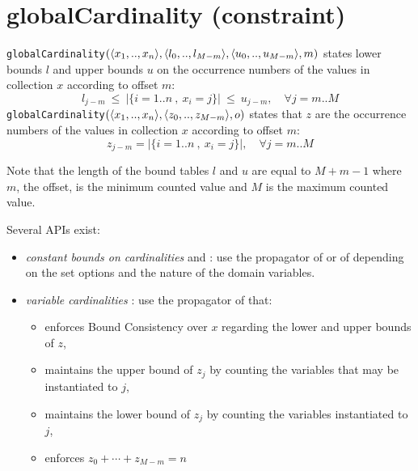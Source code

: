 \label{globalcardinality}
\hypertarget{globalcardinality}{}

\section{globalCardinality (constraint)}\label{globalcardinality:globalcardinalityconstraint}\hypertarget{globalcardinality:globalcardinalityconstraint}{}
\begin{notedef}
  \texttt{globalCardinality}$(\langle x_1,..,x_n\rangle,\langle l_0,..,l_{M-m}\rangle, \langle u_0,..,u_{M-m}\rangle, m)$ states lower bounds $l$ and upper bounds $u$ on the occurrence numbers of the values in collection $x$ according to offset $m$: 
$$l_{j-m}\ \le\ |\{i=1..n\ ,\ x_i=j\}|\ \le\ u_{j-m},\quad\forall j=m..M$$   
  \texttt{globalCardinality}$(\langle x_1,..,x_n\rangle,\langle z_0,..,z_{M-m}\rangle, o)$ states that $z$ are the occurrence numbers of the values in collection $x$ according to offset $m$: 
$$z_{j-m} = |\{i=1..n\ ,\ x_i=j\}|,\quad\forall j=m..M$$   
\end{notedef}
Note that the length of the bound tables $l$ and $u$ are equal to $M+m-1$ where $m$, the offset, is the minimum counted value and $M$ is the maximum counted value.

Several APIs exist:
\begin{itemize}
	\item \emph{constant bounds on cardinalities}  and : use the propagator of \cite{ReginAAAI96} or of \cite{QuimperCP03} depending on the set options and the nature of the domain variables.
	\item \emph{variable cardinalities} : use the propagator of \cite{QuimperCP03} that:      
      \begin{itemize}
      \item enforces Bound Consistency over $x$ regarding the lower and upper bounds of $z$, 
      \item maintains the upper bound of $z_j$ by counting the variables that may be instantiated to $j$, 
      \item maintains the lower bound of $z_j$ by counting the variables instantiated to $j$, 
      \item enforces $z_0 + \cdots + z_{M-m} = n$
      \end{itemize}
\end{itemize}

